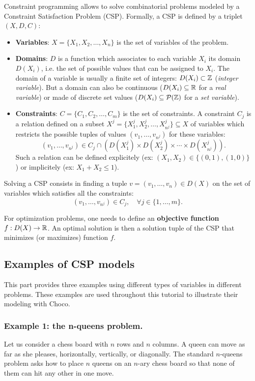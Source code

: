 Constraint programming allows to solve combinatorial problems modeled by a Constraint Satisfaction Problem (CSP). Formally, a CSP is defined by a triplet $(X,D,C)$:
\begin{itemize}
	\item \textbf{Variables}: $X = \{X_1,X_2,\ldots,X_n\}$ is the set of variables of the problem.
	\item \textbf{Domains}: $D$ is a function which associates to each variable $X_i$ its domain $D(X_i)$, i.e. the set of possible values that can be assigned to $X_i$. The domain of a variable is usually a finite set of integers: $D(X_i)\subset\mathbb{Z}$ (\emph{integer variable}). But a domain can also be continuous ($D(X_i)\subseteq\mathbb{R}$ for a \emph{real variable}) or made of discrete set values ($D(X_i)\subseteq\mathcal{P}(\mathbb{Z})$ for a \emph{set variable}).
	\item \textbf{Constraints}: $C = \{C_1,C_2,\ldots,C_m\}$ is the set of constraints. A constraint $C_j$ is a relation defined on a subset $X^j = \{X^j_1,X^j_2,\ldots,X^j_{n^j}\}\subseteq X$ of variables which restricts the possible tuples of values $(v_1,\ldots,v_{n^j})$ for these variables:
$$(v_1,\ldots,v_{n^j})\in C_j\cap (D(X^j_1)\times D(X^j_2)\times\cdots\times D(X^j_{n^j})).$$
Such a relation can be defined explicitely (ex: $(X_1,X_2)\in\{(0,1),(1,0)\}$) or implicitely (ex: $X_1+X_2\le 1$).
\end{itemize}

Solving a CSP consists in finding a tuple $v=(v_1,\ldots,v_{n})\in D(X)$ on the set of variables which satisfies all the constraints:
$$(v_1,\ldots,v_{n^j})\in C_j,\quad\forall j\in\{1,\ldots,m\}.$$

For optimization problems, one needs to define an \textbf{objective function} $f:D(X)\rightarrow\mathbb{R}$. An optimal solution is then a solution tuple of the CSP that minimizes (or maximizes) function $f$.

\subsection{Examples of CSP models}\label{introduction:examples}\hypertarget{introduction:examples}{}
This part provides three examples using different types of variables in different problems. These examples are used throughout this tutorial to illustrate their modeling with Choco.

\subsubsection{Example 1: the n-queens problem.}\label{introduction:example1:nqueens}\hypertarget{introduction:example1:nqueens}{}
Let us consider a chess board with $n$ rows and $n$ columns. A queen can move as far as she pleases, horizontally, vertically, or diagonally. The standard $n$-queens problem asks how to place $n$ queens on an $n$-ary chess board so that none of them can hit any other in one move.

